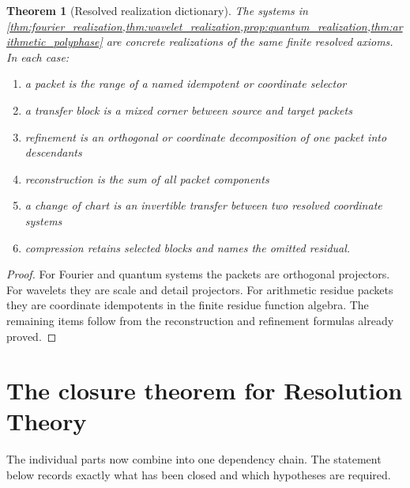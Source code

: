 \documentclass{aomart}
\newtheorem{theorem}{Theorem}[section]
\theoremstyle{definition}
\theoremstyle{remark}
\begin{document}
\begin{theorem}[Resolved realization dictionary]\label{thm:realization_dictionary}
The systems in \cref{thm:fourier_realization,thm:wavelet_realization,prop:quantum_realization,thm:arithmetic_polyphase} are concrete realizations of the same finite resolved axioms. In each case:
\begin{enumerate}
\item a packet is the range of a named idempotent or coordinate selector
\item a transfer block is a mixed corner between source and target packets
\item refinement is an orthogonal or coordinate decomposition of one packet into descendants
\item reconstruction is the sum of all packet components
\item a change of chart is an invertible transfer between two resolved coordinate systems
\item compression retains selected blocks and names the omitted residual.
\end{enumerate}
\end{theorem}

\begin{proof}
For Fourier and quantum systems the packets are orthogonal projectors. For wavelets they are scale and detail projectors. For arithmetic residue packets they are coordinate idempotents in the finite residue function algebra. The remaining items follow from the reconstruction and refinement formulas already proved.
\end{proof}

\section{The closure theorem for Resolution Theory}\label{sec:closure}

The individual parts now combine into one dependency chain. The statement below records exactly what has been closed and which hypotheses are required.
\end{document}
